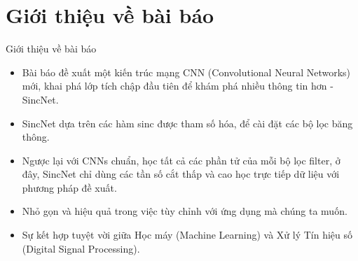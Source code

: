 \documentclass[11pt]{beamer}
\begin{document}
\section{Giới thiệu về bài báo}
\begin{frame}{Giới thiệu về bài báo}
	\begin{itemize}
		\item Bài báo đề xuất một kiến trúc mạng CNN (Convolutional Neural Networks) mới, khai phá lớp tích chập đầu tiên để khám phá nhiều thông tin hơn - SincNet.
		\item SincNet dựa trên các hàm sinc được tham số hóa, để cài đặt các bộ lọc băng thông.
		\item Ngược lại với CNNs chuẩn, học tất cả các phần tử của mỗi bộ lọc filter, ở đây, SincNet chỉ dùng các tần số cắt thấp và cao học trực tiếp dữ liệu với phương pháp đề xuất.
		\item Nhỏ gọn và hiệu quả trong việc tùy chỉnh với ứng dụng mà chúng ta muốn.
		\item Sự kết hợp tuyệt vời giữa Học máy (Machine Learning) và Xử lý Tín hiệu số (Digital
		Signal Processing).
	\end{itemize}
\end{frame}
\end{document}
